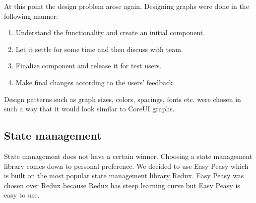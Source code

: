 At this point the design problem arose again.
Designing graphs were done in the following manner:
\begin{enumerate}
    \item Understand the functionality and create an initial component.
    \item Let it settle for some time and then discuss with team.
    \item Finalize component and release it for test users.
    \item Make final changes according to the users' feedback.
\end{enumerate}
Design patterns such as graph sizes, colors, spacings, fonts etc. were chosen in such a way that it would look similar to CoreUI graphs.

\subsection{State management}\label{subsec:state-management}
State management does not have a certain winner.
Choosing a state management library comes down to personal preference.
We decided to use Easy Peasy which is built on the most popular state management library Redux.
Easy Peasy was chosen over Redux because Redux has steep learning curve but Easy Peasy is easy to use.
